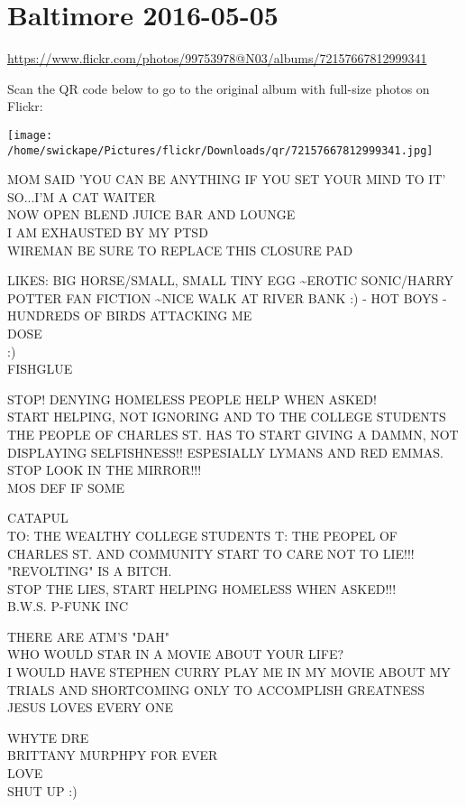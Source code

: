 \documentclass[10pt,letterpaper]{article}
\begin{document}
\section*{Baltimore 2016-05-05}

\url{https://www.flickr.com/photos/99753978@N03/albums/72157667812999341}

Scan the QR code below to go to the original album with full-size photos on Flickr:

\texttt{[image: /home/swickape/Pictures/flickr/Downloads/qr/72157667812999341.jpg]}


MOM SAID 'YOU CAN BE ANYTHING IF YOU SET YOUR MIND TO IT' SO...I'M A CAT WAITER\\
NOW OPEN BLEND JUICE BAR AND LOUNGE\\
I AM EXHAUSTED BY MY PTSD\\
WIREMAN BE SURE TO REPLACE THIS CLOSURE PAD

LIKES: BIG HORSE/SMALL, SMALL TINY EGG \textasciitilde{}EROTIC SONIC/HARRY POTTER FAN FICTION \textasciitilde{}NICE WALK AT RIVER BANK :) {-} HOT BOYS {-} HUNDREDS OF BIRDS ATTACKING ME\\
DOSE\\
:)\\
FISHGLUE

STOP! DENYING HOMELESS PEOPLE HELP WHEN ASKED!\\
START HELPING, NOT IGNORING  AND TO THE COLLEGE STUDENTS\\
THE PEOPLE OF CHARLES ST. HAS TO START GIVING A DAMMN, NOT DISPLAYING SELFISHNESS!! ESPESIALLY LYMANS AND RED EMMAS.  STOP LOOK IN THE MIRROR!!!\\
MOS DEF IF SOME

CATAPUL\\
TO: THE WEALTHY COLLEGE STUDENTS   T: THE PEOPEL OF CHARLES ST. AND COMMUNITY START TO CARE NOT TO LIE!!! "REVOLTING" IS A BITCH.\\
STOP THE LIES, START HELPING HOMELESS WHEN ASKED!!!\\
B.W.S. P{-}FUNK INC

THERE ARE ATM'S "DAH"\\
WHO WOULD STAR IN A MOVIE ABOUT YOUR LIFE?\\
I WOULD HAVE STEPHEN CURRY PLAY ME IN MY MOVIE ABOUT MY TRIALS AND SHORTCOMING ONLY TO ACCOMPLISH GREATNESS\\
JESUS LOVES EVERY ONE

WHYTE DRE\\
BRITTANY MURPHPY FOR EVER\\
LOVE\\
SHUT UP :)
\end{document}
